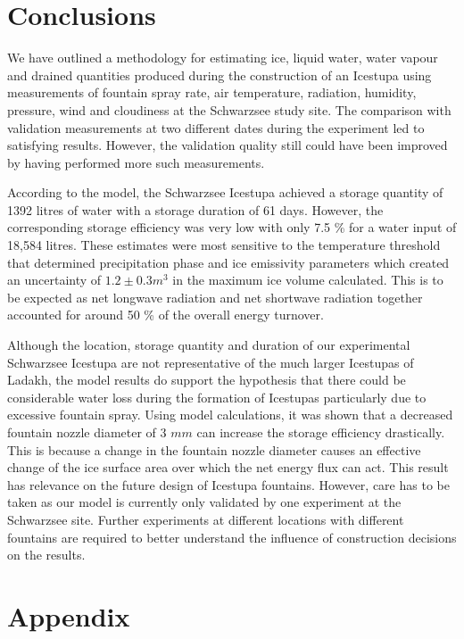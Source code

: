 \documentclass[utf8]{frontiersSCNS} %
\begin{document}
\section{Conclusions} We have outlined a methodology for estimating ice, liquid water, water vapour and drained
quantities produced during the construction of an Icestupa using measurements of fountain spray rate, air temperature,
radiation, humidity, pressure, wind and cloudiness at the Schwarzsee study site. The comparison with validation
measurements at two different dates during the experiment led to satisfying results. However, the validation quality
still could have been improved by having performed more such measurements.

According to the model, the Schwarzsee Icestupa achieved a storage quantity of 1392 litres of water with a storage
duration of 61 days. However, the corresponding storage efficiency was very low with only 7.5 \% for a water input of
18,584 litres. These estimates were most sensitive to the temperature threshold that determined precipitation phase and
ice emissivity parameters which created an uncertainty of $1.2 \pm 0.3 m^3$ in the maximum ice volume calculated. This
is to be expected as net longwave radiation and net shortwave radiation together accounted for around 50 \% of the
overall energy turnover.

Although the location, storage quantity and duration of our experimental Schwarzsee Icestupa are not representative of
the much larger Icestupas of Ladakh, the model results do support the hypothesis that there could be considerable water
loss during the formation of Icestupas particularly due to excessive fountain spray. Using model calculations, it was
shown that a decreased fountain nozzle diameter of 3 $mm$ can increase the storage efficiency drastically. This is
because a change in the fountain nozzle diameter causes an effective change of the ice surface area over which the net
energy flux can act. This result has relevance on the future design of Icestupa fountains. However, care has to be taken
as our model is currently only validated by one experiment at the Schwarzsee site. Further experiments at different
locations with different fountains are required to better understand the influence of construction decisions on the
results. 



\section{Appendix}
\end{document}
